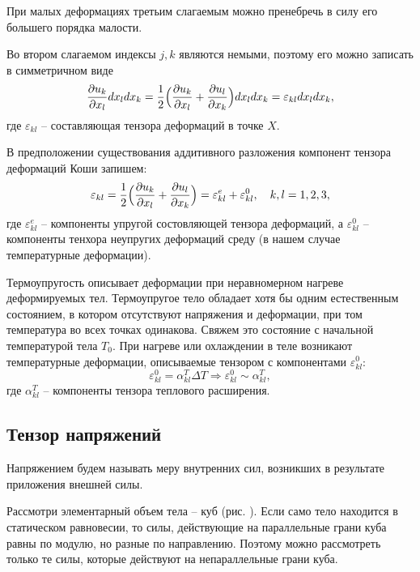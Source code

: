 \documentclass[12pt,a4paper]{article}
\begin{document}
    При малых деформациях третьим слагаемым можно пренебречь в силу его большего порядка малости. 

    Во втором слагаемом индексы $j, k$ являются немыми, поэтому его можно записать в симметричном виде
    \begin{equation}
      \dfrac{\partial u_k}{\partial x_l} dx_l dx_k = \dfrac{1}{2} \Bigl( \dfrac{\partial u_k}{\partial x_l} + \dfrac{\partial u_l}{\partial x_k} \Bigr)dx_l dx_k = \varepsilon_{kl} dx_l dx_k,
      \label{deformTensorComponent}
    \end{equation}
    \noindent где $\varepsilon_{kl}$ -- составляющая тензора деформаций в точке $X$. 
    
    В предположении существования аддитивного разложения компонент тензора деформаций Коши запишем:
    \[
      \varepsilon_{kl} = \dfrac{1}{2}\Bigl( \dfrac{\partial u_k}{\partial x_l} + \dfrac{\partial u_l}{\partial x_k} \Bigr) = \varepsilon_{kl}^e +  \varepsilon_{kl}^0, \quad k, l = 1, 2, 3,
    \]
    \noindent где $\varepsilon_{kl}^e$ -- компоненты упругой состовляющей тензора деформаций, а $ \varepsilon_{kl}^0 $ -- компоненты тенхора неупругих деформаций среду (в нашем случае температурные деформации).
    
    Термоупругость описывает деформации при неравномерном нагреве деформируемых тел. Термоупругое тело обладает хотя бы одним естественным состоянием, в котором отсутствуют напряжения и деформации, при том температура во всех точках одинакова. Свяжем это состояние с начальной температурой тела $T_0$. При нагреве или охлаждении в теле возникают температурные деформации, описываемые тензором с компонентами $ \varepsilon_{kl}^0 \colon$
    \[
      \varepsilon_{kl}^0 = \alpha_{kl}^T \Delta T \Rightarrow \varepsilon_{kl}^0 \sim \alpha_{kl}^T,
    \]
    \noindent где $ \alpha_{kl}^T $ -- компоненты тензора теплового расширения.

    \subsection{Тензор напряжений}

    Напряжением будем называть меру внутренних сил, возникших в результате приложения внешней силы. 

    Рассмотри элементарный объем тела -- куб (рис. ). Если само тело находится в статическом равновесии, то силы, действующие на параллельные грани куба равны по модулю, но разные по направлению. Поэтому можно рассмотреть только те силы, которые действуют на непараллельные грани куба.
\end{document}
